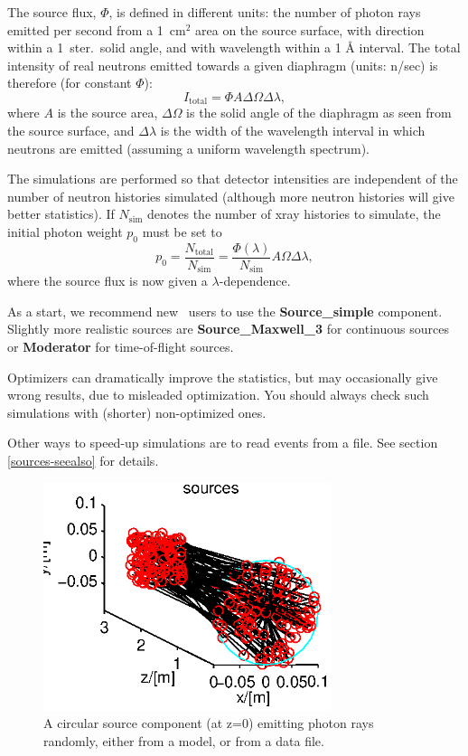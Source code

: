 The source flux, $\Phi$, is defined in different units:
the number of photon rays emitted per second from a
1~cm$^2$ area on the source surface,
with direction within a 1~ster.\ solid angle,
and with wavelength within a 1 {\AA} interval.
The total intensity of real neutrons emitted towards a given diaphragm
(units: n/sec) is therefore (for constant $\Phi$):
\begin{equation}
I_\mathrm{total} = \Phi A \Delta\Omega \Delta\lambda ,
\end{equation}
where $A$ is the source area, $\Delta\Omega$ is the solid angle of the
diaphragm as seen from the source surface, and $\Delta\lambda$ is the
width of the wavelength interval in which neutrons are emitted (assuming
a uniform wavelength spectrum).

The simulations are performed so that detector intensities
are independent of the number of neutron histories simulated
(although more neutron histories will give better statistics).
If $N_\mathrm{sim}$ denotes the number of
xray histories to simulate, the initial photon weight $p_0$ must be set to
\begin{equation}
\label{proprule}
p_0 = \frac{N_\mathrm{total}}{N_\mathrm{sim}} =
    \frac{\Phi(\lambda)}{N_\mathrm{sim}} A \Omega \Delta\lambda ,
\end{equation}
where the source flux is now given a $\lambda$-dependence.

As a start, we recommend new \MCX\ users to use the
\textbf{Source\_simple} component.
Slightly more realistic sources are \textbf{Source\_Maxwell\_3} for
continuous sources or \textbf{Moderator} for time-of-flight sources.

Optimizers can dramatically improve the statistics, but may occasionally
give wrong results, due to misleaded optimization.
You should always check such simulations with (shorter) non-optimized ones.

Other ways to speed-up simulations are to read events from a file.
See section \ref{sources-seealso} for details.

\begin{figure}
  \begin{center}
    \includegraphics[width=0.75\textwidth]{figures/sources.eps}
  \end{center}
\caption{A circular source component (at z=0) emitting photon rays randomly, either from a model, or from a data file.}
\label{f:source}
\end{figure}

